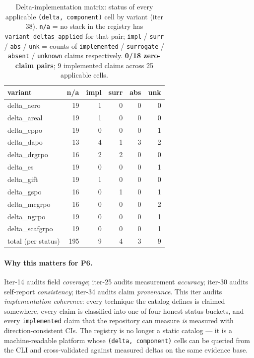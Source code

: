 \documentclass{article}
\begin{document}
\begin{table}[t]
\centering\small
\caption{Delta-implementation matrix: status of every applicable
\texttt{(delta, component)} cell by variant (iter 38). \texttt{n/a}
= no stack in the registry has \texttt{variant\_deltas\_applied} for
that pair; \texttt{impl} / \texttt{surr} / \texttt{abs} / \texttt{unk}
= counts of \texttt{implemented} / \texttt{surrogate} / \texttt{absent}
/ \texttt{unknown} claims respectively. \textbf{0/18 zero-claim pairs};
9 implemented claims across 25 applicable cells.}
\label{tab:p6-delta-implementation}
\begin{tabular}{l r r r r r}
\toprule
variant & n/a & impl & surr & abs & unk \\
\midrule
delta\_aero      & 19 & 1 & 0 & 0 & 0 \\
delta\_areal     & 19 & 1 & 0 & 0 & 0 \\
delta\_cppo      & 19 & 0 & 0 & 0 & 1 \\
delta\_dapo      & 13 & 4 & 1 & 3 & 2 \\
delta\_drgrpo    & 16 & 2 & 2 & 0 & 0 \\
delta\_es        & 19 & 0 & 0 & 0 & 1 \\
delta\_gift      & 19 & 1 & 0 & 0 & 0 \\
delta\_gspo      & 16 & 0 & 1 & 0 & 1 \\
delta\_mcgrpo    & 16 & 0 & 0 & 0 & 2 \\
delta\_ngrpo     & 19 & 0 & 0 & 0 & 1 \\
delta\_scafgrpo  & 19 & 0 & 0 & 0 & 1 \\
\midrule
total (per status) & 195 & 9 & 4 & 3 & 9 \\
\bottomrule
\end{tabular}
\end{table}

\paragraph{Why this matters for P6.}
Iter-14 audits field \emph{coverage}; iter-25 audits measurement
\emph{accuracy}; iter-30 audits self-report \emph{consistency}; iter-34
audits claim \emph{provenance}. This iter audits
\emph{implementation coherence}: every technique the catalog defines
is claimed somewhere, every claim is classified into one of four
honest status buckets, and every \texttt{implemented} claim that the
repository can measure \emph{is} measured with direction-consistent
CIs. The registry is no longer a static catalog --- it is a
machine-readable platform whose \texttt{(delta, component)} cells can
be queried from the CLI and cross-validated against measured deltas
on the same evidence base.
\end{document}
